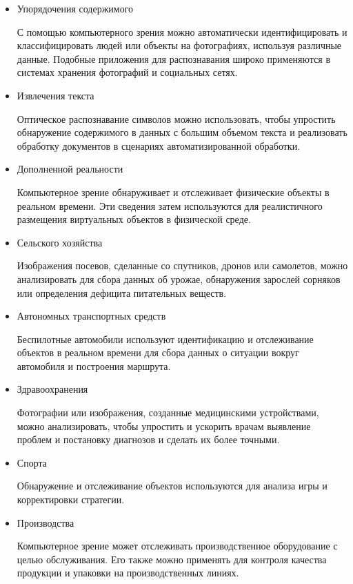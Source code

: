\documentclass[bachelor, och, referat, times]{SCWorks}
\begin{document}
\begin{itemize}
\item Упорядочения содержимого 

С помощью компьютерного зрения можно автоматически идентифицировать и классифицировать людей или объекты на фотографиях, используя различные данные. Подобные приложения для распознавания широко применяются в системах хранения фотографий и социальных сетях.

\item Извлечения текста 

Оптическое распознавание символов можно использовать, чтобы упростить обнаружение содержимого в данных с большим объемом текста и реализовать обработку документов в сценариях автоматизированной обработки.

\item Дополненной реальности 

Компьютерное зрение обнаруживает и отслеживает физические объекты в реальном времени. Эти сведения затем используются для реалистичного размещения виртуальных объектов в физической среде.

\item Сельского хозяйства

Изображения посевов, сделанные со спутников, дронов или самолетов, можно анализировать для сбора данных об урожае, обнаружения зарослей сорняков или определения дефицита питательных веществ.

\item Автономных транспортных средств

Беспилотные автомобили используют идентификацию и отслеживание объектов в реальном времени для сбора данных о ситуации вокруг автомобиля и построения маршрута.

\item Здравоохранения 

Фотографии или изображения, созданные медицинскими устройствами, можно анализировать, чтобы упростить и ускорить врачам выявление проблем и постановку диагнозов и сделать их более точными.

\item Спорта

Обнаружение и отслеживание объектов используются для анализа игры и корректировки стратегии.

\item Производства

Компьютерное зрение может отслеживать производственное оборудование с целью обслуживания. Его также можно применять для контроля качества продукции и упаковки на производственных линиях.


\end{itemize}
\end{document}
